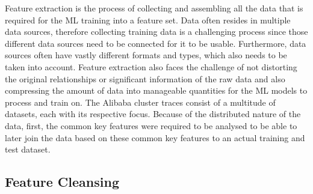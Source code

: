     Feature extraction is the process of collecting and assembling all the data that is required for the ML training into a feature set.
    Data often resides in multiple data sources, therefore collecting training data is a challenging process since those different data sources need to be connected for it to be usable. Furthermore, data sources often have vastly different formats and types, which also needs to be taken into account. 
    Feature extraction also faces the challenge of not distorting the original relationships or significant information of the raw data and also compressing the amount of data into manageable quantities for the ML models to process and train on.
    The Alibaba cluster traces consist of a multitude of datasets, each with its respective focus. Because of the distributed nature of the data, first, the common key features were required to be analysed to be able to later join the data based on these common key features to an actual training and test dataset.

  \subsection{Feature Cleansing}
  \label{sec:feature-cleansing-preprocessing-architecture}

